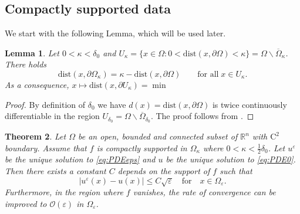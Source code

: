 \documentclass[11pt,reqno]{amsart}
\numberwithin{figure}{section}
\theoremstyle{plain}
\newtheorem{thm}{Theorem}[section]
\newtheorem{lem}[thm]{Lemma}
\theoremstyle{remark}
\numberwithin{equation}{section}
\newcommand{\R}{\mathbb{R}}
\begin{document}
\subsection{Compactly supported data}



We start with the following Lemma, which will be used later.
\begin{lem} Let $0<\kappa < \delta_0$ and $U_\kappa = \big\{x\in \Omega: 0<\mathrm{dist}(x,\partial\Omega) < \kappa\big\} = \Omega\backslash \overline{\Omega}_\kappa$. There holds
\begin{equation*}
    \mathrm{dist}(x,\partial\Omega_\kappa) = \kappa - \mathrm{dist}(x,\partial\Omega) \qquad\text{for all}\;x\in U_\kappa.
\end{equation*}
As a consequence, $x\mapsto \mathrm{dist}(x,\partial U_\kappa) = \min$ 
\end{lem}

\begin{proof} By definition of $\delta_0$ we have $d(x) = \mathrm{dist}(x,\partial\Omega)$ is twice continuously differentiable in the region $U_{\delta_0} = \Omega\backslash \overline{\Omega}_{\delta_0}$. The proof follows from \textcolor{blue}{\cite[p. 355]{gilbarg_elliptic_2001}}. 
\end{proof}



\begin{thm}\label{thm:rate_doubling0} Let $\Omega$ be an open, bounded and connected subset of $\R^n$ with $\mathrm{C}^2$ boundary. Assume that $f$ is compactly supported in $\Omega_\kappa$ where $0<\kappa < \frac{1}{2}\delta_{0}$. Let $u^\varepsilon$ be the unique solution to \eqref{eq:PDEeps} and $u$ be the unique solution to \eqref{eq:PDE0}. Then there exists a constant $C$ depends on the support of $f$ such that
\begin{equation*}
|u^\varepsilon(x) - u(x)| \leq C\sqrt{\varepsilon} \quad  \text{for} \quad x\in \Omega_{\varepsilon}.
\end{equation*}
Furthermore, in the region where $f$ vanishes, the rate of convergence can be improved to $\mathcal{O}(\varepsilon)$ in $\Omega_\varepsilon$.
\end{thm}
\end{document}
